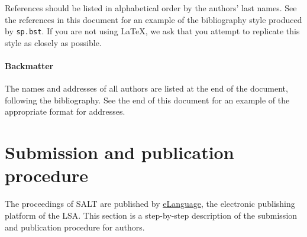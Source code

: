 \documentclass{salt}
\begin{document}
References should be listed in alphabetical order by the authors' last names. See the references in this document for an example of the bibliography style produced by \verb+sp.bst+. If you are not using \LaTeX, we ask that you attempt to replicate this style as closely as possible. 

\paragraph{Backmatter}

The names and addresses of all authors are listed at the end of the document, following the bibliography. See the end of this document for an example of the appropriate format for addresses.


\section{Submission and publication  procedure}\label{sec:submission-procedure}

The proceedings of SALT are published by \href{http://www.elanguage.net}{eLanguage}, the electronic publishing platform of the LSA.  This section is a step-by-step description of the submission and publication procedure for authors.  
\end{document}
